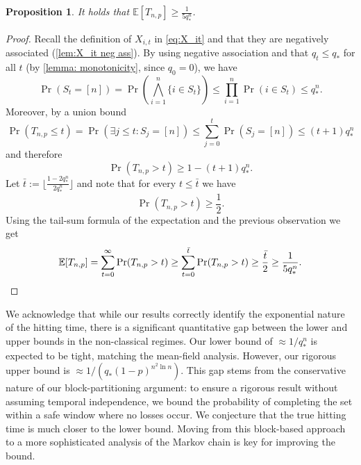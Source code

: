 \documentclass[11pt,a4paper]{article}
\newtheorem{proposition}[theorem]{Proposition}
\newcommand{\cond}{\mid}
\newcommand{\E}{\mathbb{E}}
\begin{document}


\begin{proposition}\label{prop:unconditional lower bound E[Tnp]}
It holds that $\E[T_{n,p}] \ge \frac{1}{5 q_*^n}$.

\end{proposition}
\begin{proof}
Recall the definition of $X_{i,t}$ in \cref{eq:X_it} and that they are negatively associated (\cref{lem:X_it neg ass}).
By using negative association and that $q_t \le q_*$ for all $t$ (by \cref{lemma: monotonicity}, since $q_0 = 0$), we have
\[
    \Pr(S_t = [n]) = \Pr\left( \bigwedge_{i=1}^n \{i \in S_t \}\right)
    \le \prod_{i=1}^n \Pr(i \in S_t)
    \le q_*^n.
\]
Moreover, by a union bound
\[
    \Pr(T_{n,p} \le t) = \Pr(\exists j \le t : S_j = [n])
    \le \sum_{j=0}^t \Pr(S_j = [n])
    \le (t+1) q_*^n
\]
and therefore
\[
    \Pr(T_{n,p} > t) \ge 1 - (t+1) q_*^n.
\]
Let $\bar{t} := \big\lfloor \frac{1 - 2 q_*^n}{2 q_*^n} \big\rfloor$ and note that for every $t \le \bar{t}$ we have
\[
    \Pr(T_{n,p} > t) \ge \frac{1}{2}.
\]
Using the tail-sum formula of the expectation and the previous observation we get
\[
    \E[T_{n,p}] = \sum_{t=0}^{\infty} \Pr(T_{n,p} > t) 
    \ge \sum_{t=0}^{\bar{t}} \Pr(T_{n,p} > t) 
    \ge \frac{\bar{t}}{2}
    \ge \frac{1}{5q_*^n}.
    \qedhere
\]
\end{proof}


We acknowledge that while our results correctly identify the exponential nature of the hitting time, there is a significant quantitative gap between the lower and upper bounds in the non-classical regimes. 
Our lower bound of $\approx 1/q_*^n$ is expected to be tight, matching the mean-field analysis. However, our rigorous upper bound is $\approx 1/(q_*(1-p)^{n^2 \ln n})$.
This gap stems from the conservative nature of our block-partitioning argument: to ensure a rigorous result without assuming temporal independence, we bound the probability of completing the set within a safe window where no losses occur. We conjecture that the true hitting time is much closer to the lower bound. 
Moving from this block-based approach to a more sophisticated analysis of the Markov chain is key for improving the bound.




\end{document}

